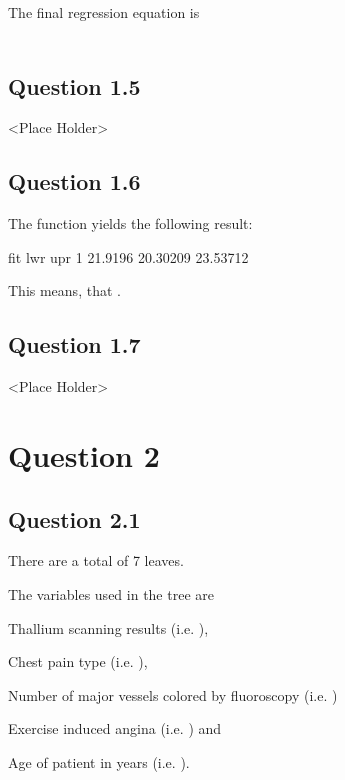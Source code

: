 \documentclass[parskip=full]{scrartcl}
\begin{document}
    The final regression equation is \\
    \\

    \subsection*{Question 1.5}

    <Place Holder>

    \subsection*{Question 1.6}


    The  function yields the following result:
    
    \begin{lcverbatim}
      fit      lwr      upr
1 21.9196 20.30209 23.53712
    \end{lcverbatim}
    
    This means, that .

    \subsection*{Question 1.7}

    
    <Place Holder>
\section*{Question 2}
    \subsection*{Question 2.1}

    There are a total of 7 leaves.

    The variables used in the tree are
    \begin{inparaenum}[(1)]
        \item Thallium scanning results (i.e. ),
        \item Chest pain type (i.e. ),
        \item Number of major vessels colored by fluoroscopy (i.e. )
        \item Exercise induced angina (i.e. ) and
        \item Age of patient in years (i.e. ).
    \end{inparaenum}
\end{document}

